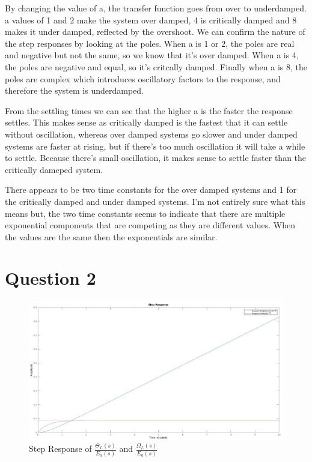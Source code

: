 \documentclass[a4paper, 12pt]{article}
\begin{document}
        By changing the value of a, the transfer function goes from over to underdamped. a values of 1 and 2 make the system over damped, 4 is critically damped and 8 makes it under damped, reflected by the overshoot. We can confirm the nature of the step responses by looking at the poles. When a is 1 or 2, the poles are real and negative but not the same, so we know that it's over damped. When a is 4, the poles are negative and equal, so it's critcally damped. Finally when a is 8, the poles are complex which introduces oscillatory factors to the response, and therefore the system is underdamped.   
        \par
        From the settling times we can see that the higher a is the faster the response settles. This makes sense as critically damped is the fastest that it can settle without oscillation, whereas over damped systems go slower and under damped systems are faster at rising, but if there's too much oscillation it will take a while to settle. Because there's small oscillation, it makes sense to settle faster than the critically dameped system.
        \par
        There appears to be two time constants for the over damped systems and 1 for the critically damped and under damped systems. I'm not entirely sure what this means but, the two time constants seems to indicate that there are multiple exponential components that are competing as they are different values. When the values are the same then the exponentials are similar.

    \section{Question 2}

        

        \begin{figure}[!h]
            \centering
            \includegraphics[width=\textwidth]{q2.jpg}
            \caption{Step Response of $\frac{\Theta_L(s)}{E_a(s)}$ and $\frac{\Omega_L(s)}{E_a(s)}$}
            \label{fig:q2}
        \end{figure}
\end{document}
